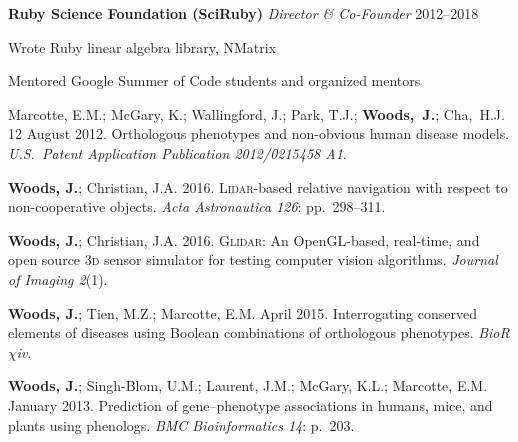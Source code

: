 \documentclass[12pt,letterpaper]{article}
\newenvironment{itemize*}%
{\begin{itemize}%
  \setlength{\itemsep}{0pt}}%
{\end{itemize}}
\newcommand{\mhead}[1]{\leavevmode\marginpar{\sffamily\footnotesize #1}}
\newcommand{\rdate}[1]{{\hfill #1}}
\begin{document}
{\medskip
\textbf{Ruby Science Foundation (SciRuby)} \newline %
\emph{Director \& Co-Founder} \rdate{2012--2018}
\begin{itemize*}
  \item Wrote Ruby linear algebra library, NMatrix
  \item Mentored Google Summer of Code students and organized mentors
\end{itemize*}

%


\bigskip
\mhead{Patents}%
\par\vspace{-\baselineskip}Marcotte, E.M.; McGary, K.; Wallingford, J.; Park, T.J.; \textbf{Woods,~J.}; Cha,~H.J. 12 August 2012. Orthologous phenotypes and non-obvious human disease models. \textit{U.S.\ Patent Application Publication 2012/0215458 A1}.


\bigskip
\mhead{Articles}%
\par\vspace{-\baselineskip}%
\par\textbf{Woods, J.}; Christian, J.A. 2016. \textsc{Lidar}-based relative navigation with respect to non-cooperative objects. \textit{Acta Astronautica 126}: pp.\ 298--311.

\medskip
\par\textbf{Woods, J.}; Christian, J.A. 2016. \textsc{Glidar}: An OpenGL-based, real-time, and open source 3\textsc{d} sensor simulator for testing computer vision algorithms. \textit{Journal of Imaging 2}(1).

\medskip
\par\textbf{Woods, J.}; Tien, M.Z.; Marcotte, E.M. April 2015. Interrogating conserved elements of diseases using Boolean combinations of orthologous phenotypes. \textit{BioR$\chi$iv}.

\medskip
\par\textbf{Woods, J.}; Singh-Blom, U.M.; Laurent, J.M.; McGary, K.L.; Marcotte, E.M. January 2013. Prediction of gene--phenotype associations in humans, mice, and plants using phenologs. \textit{BMC Bioinformatics 14}: p.\ 203.

}
\end{document}
